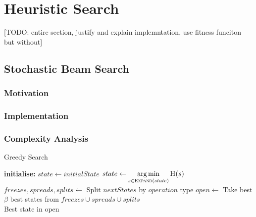 \documentclass[12pt,a4paper,twoside,openany]{report} \usepackage[pdfborder={0 0 0}]{hyperref}    %
\theoremstyle{definition} \newtheorem{definition}{Definition}[section]
\begin{document}
    \FloatBarrier

    \section{Heuristic Search} 
    \label{sub:searchImpl}
    [TODO: entire section, justify and explain implemntation, use fitness funciton but without] 

    \subsection {Stochastic Beam Search}

    \subsubsection{Motivation}
    \subsubsection{Implementation}
    \subsubsection{Complexity Analysis}

    \begin{algorithm}[ht] \caption{Greedy Search} \label{code:greedy} \begin{algorithmic} \State \textbf{initialise:
      } $state \gets initialState$  \State $state \gets \argmin\limits_{s \in
      \Call{Expand}{state}} \Call{H}{s} $ \State $freezes, spreads, splits \gets $ Split $nextStates$ by $operation$
      type \State $open \gets $ Take best $\beta$ best states from $freezes \cup spreads \cup splits$ \EndWhile \\
    \Return Best state in open \end{algorithmic} \end{algorithm}
\end{document}
